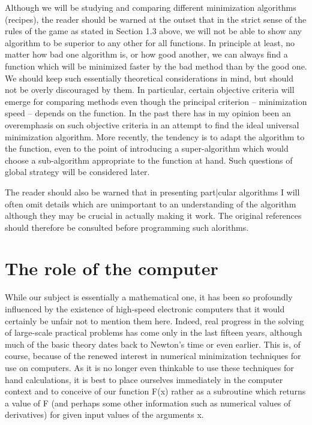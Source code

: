      Although we will be studying and comparing
different minimization algorithms (recipes), the reader should be warned
at the outset that in the strict sense of the rules of the game as stated
in Section 1.3 above, we will not be able to show any algorithm to be
superior to any other for all functions.  In principle at least, no
matter how bad one algorithm is, or how good another, we can always find
a function which will be minimized faster by the bad method than by the
good one.  We should keep such essentially theoretical considerations in
mind, but should not be overly discouraged by them.  In particular,
certain objective criteria will emerge for comparing methods even though
the principal criterion -- minimization speed -- depends on the function.
In the past there has in my opinion been an overemphasis on such objective
criteria in an attempt to find the ideal universal minimization
algorithm.  More recently, the tendency is to adapt the algorithm to
the function, even to the point of introducing a super-algorithm which
would
choose a sub-algorithm appropriate to the function at hand. Such questions
of global strategy will be considered later.
 
     The reader should also be warned that in presenting part|cular
algorithms I will often omit details which are unimportant to an
understanding of the algorithm although they may be crucial in actually
making it work.  The original references should therefore be consulted
before programming such alorithms.
 
 
\section{The role of the computer}
 
     While our subject is essentially a mathematical one, it has been so
profoundly influenced by the existence of high-speed electronic computers
that it would certainly be unfair  not to mention them here.  Indeed,
real progress in the solving of large-scale practical problems has come
only in the last fifteen years, although much of the basic theory dates
back to Newton's time or even earlier.  This is, of course, because of
the renewed interest in numerical minimization techniques for use on
computers.  As it is no longer even thinkable to use these techniques
for hand calculations, it is best to place ourselves immediately in the
computer context and to conceive of our function F(x) rather as a
subroutine which returns a value of F (and perhaps some other information
such as numerical values of derivatives) for given input values of the
arguments x.
 
